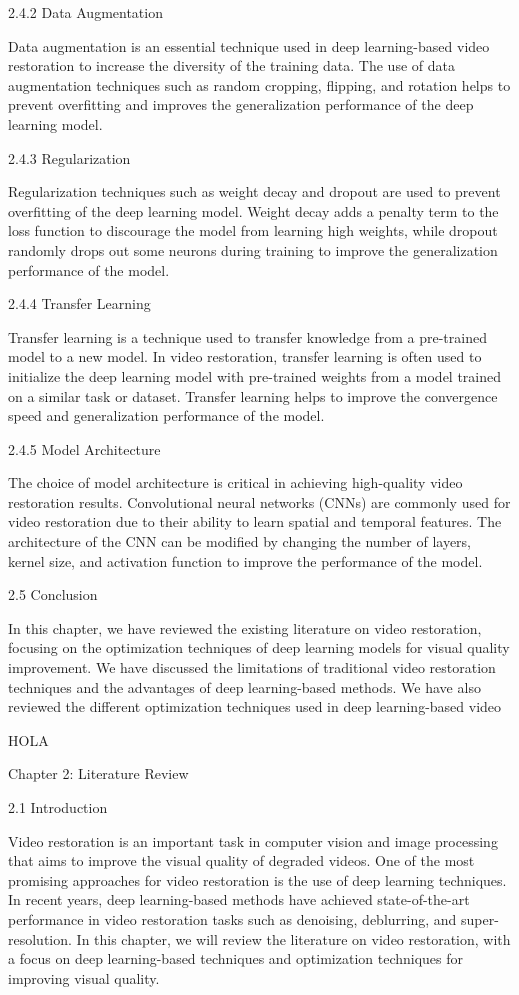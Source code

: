 2.4.2 Data Augmentation

Data augmentation is an essential technique used in deep learning-based video restoration to increase the diversity of the training data. The use of data augmentation techniques such as random cropping, flipping, and rotation helps to prevent overfitting and improves the generalization performance of the deep learning model.

2.4.3 Regularization

Regularization techniques such as weight decay and dropout are used to prevent overfitting of the deep learning model. Weight decay adds a penalty term to the loss function to discourage the model from learning high weights, while dropout randomly drops out some neurons during training to improve the generalization performance of the model.

2.4.4 Transfer Learning

Transfer learning is a technique used to transfer knowledge from a pre-trained model to a new model. In video restoration, transfer learning is often used to initialize the deep learning model with pre-trained weights from a model trained on a similar task or dataset. Transfer learning helps to improve the convergence speed and generalization performance of the model.

2.4.5 Model Architecture

The choice of model architecture is critical in achieving high-quality video restoration results. Convolutional neural networks (CNNs) are commonly used for video restoration due to their ability to learn spatial and temporal features. The architecture of the CNN can be modified by changing the number of layers, kernel size, and activation function to improve the performance of the model.

2.5 Conclusion

In this chapter, we have reviewed the existing literature on video restoration, focusing on the optimization techniques of deep learning models for visual quality improvement. We have discussed the limitations of traditional video restoration techniques and the advantages of deep learning-based methods. We have also reviewed the different optimization techniques used in deep learning-based video

HOLA

Chapter 2: Literature Review

2.1 Introduction

Video restoration is an important task in computer vision and image processing that aims to improve the visual quality of degraded videos. One of the most promising approaches for video restoration is the use of deep learning techniques. In recent years, deep learning-based methods have achieved state-of-the-art performance in video restoration tasks such as denoising, deblurring, and super-resolution. In this chapter, we will review the literature on video restoration, with a focus on deep learning-based techniques and optimization techniques for improving visual quality.

